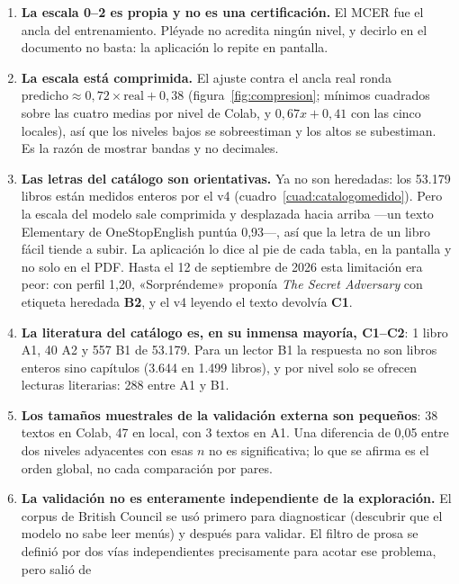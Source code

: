 \documentclass[11pt,a4paper]{article}
\begin{document}
\begin{enumerate}[leftmargin=*, itemsep=4pt]
  \item \textbf{La escala 0--2 es propia y no es una certificación.} El MCER fue el ancla
        del entrenamiento. Pléyade no acredita ningún nivel, y decirlo en el documento
        no basta: la aplicación lo repite en pantalla.
  \item \textbf{La escala está comprimida.} El ajuste contra el ancla real ronda
        $\text{predicho} \approx 0{,}72 \times \text{real} + 0{,}38$
        (figura~\ref{fig:compresion}; mínimos cuadrados sobre las cuatro medias por nivel
        de Colab, y $0{,}67x + 0{,}41$ con las cinco locales), así que los niveles bajos se
        sobreestiman y los altos se subestiman. Es la razón de mostrar bandas y no decimales.
  \item \textbf{Las letras del catálogo son orientativas.} Ya no son heredadas: los 53.179
        libros están medidos enteros por el v4 (cuadro~\ref{cuad:catalogomedido}). Pero la
        escala del modelo sale comprimida y desplazada hacia arriba ---un texto Elementary
        de OneStopEnglish puntúa 0,93---, así que la letra de un libro fácil tiende a subir.
        La aplicación lo dice al pie de cada tabla, en la pantalla y no solo en el PDF.
        Hasta el 12 de septiembre de 2026 esta limitación era peor: con perfil 1,20,
        «Sorpréndeme» proponía \emph{The Secret Adversary} con etiqueta heredada
        \textbf{B2}, y el v4 leyendo el texto devolvía \textbf{C1}.
  \item \textbf{La literatura del catálogo es, en su inmensa mayoría, C1--C2}: 1 libro A1,
        40 A2 y 557 B1 de 53.179. Para un lector B1 la respuesta no son libros enteros sino
        capítulos (3.644 en 1.499 libros), y por nivel solo se ofrecen lecturas literarias:
        288 entre A1 y B1.
  \item \textbf{Los tamaños muestrales de la validación externa son pequeños}: 38 textos
        en Colab, 47 en local, con 3 textos en A1. Una diferencia de 0,05 entre dos
        niveles adyacentes con esas $n$ no es significativa; lo que se afirma es el orden
        global, no cada comparación por pares.
  \item \textbf{La validación no es enteramente independiente de la exploración.} El
        corpus de British Council se usó primero para diagnosticar (descubrir que el
        modelo no sabe leer menús) y después para validar. El filtro de prosa se definió
        por dos vías independientes precisamente para acotar ese problema, pero salió de

\end{enumerate}
\end{document}
